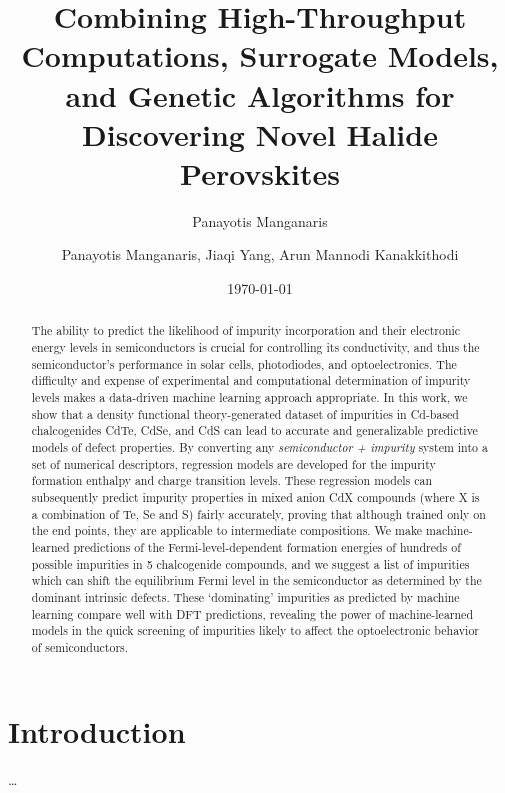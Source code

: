 \documentclass[preprint]{revtex4-2}
\author{Panayotis Manganaris}
\date{\today}
\title{Combining High-Throughput Computations, Surrogate Models, and Genetic Algorithms for Discovering Novel Halide Perovskites}
\begin{document}
\begin{abstract}
The ability to predict the likelihood of impurity incorporation and their electronic energy levels in
semiconductors is crucial for controlling its conductivity, and thus the semiconductor's performance in solar
cells, photodiodes, and optoelectronics. The difficulty and expense of experimental and computational
determination of impurity levels makes a data-driven machine learning approach appropriate. In this work, we
show that a density functional theory-generated dataset of impurities in Cd-based chalcogenides CdTe, CdSe,
and CdS can lead to accurate and generalizable predictive models of defect properties. By converting any
\textit{semiconductor + impurity} system into a set of numerical descriptors, regression models are developed
for the impurity formation enthalpy and charge transition levels. These regression models can subsequently
predict impurity properties in mixed anion CdX compounds (where X is a combination of Te, Se and S) fairly
accurately, proving that although trained only on the end points, they are applicable to intermediate
compositions. We make machine-learned predictions of the Fermi-level-dependent formation energies of hundreds
of possible impurities in 5 chalcogenide compounds, and we suggest a list of impurities which can shift the
equilibrium Fermi level in the semiconductor as determined by the dominant intrinsic defects. These
`dominating' impurities as predicted by machine learning compare well with DFT predictions, revealing the
power of machine-learned models in the quick screening of impurities likely to affect the optoelectronic
behavior of semiconductors.
\end{abstract}

\maketitle

\author{Panayotis Manganaris, Jiaqi Yang, Arun Mannodi Kanakkithodi}

\section*{Introduction}
\label{sec:org0a7de64}
\ldots{}\\
\end{document}
